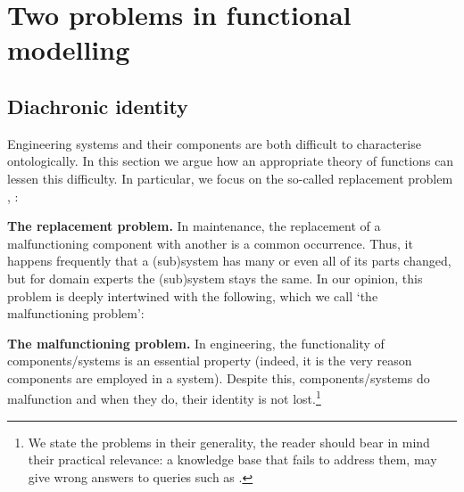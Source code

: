 \documentclass[
]{ceurart}
\begin{document}
\section{Two problems in functional modelling}

\subsection{Diachronic identity}\label{subsec:identity}
Engineering systems and their components are both difficult to characterise ontologically. %
In this section we argue how an appropriate theory of functions can lessen this difficulty. %
In particular, we focus on the so-called replacement problem \cite{guarinoArtefactualSystemsMissing2014},  \cite[Chapter 14]{westDevelopingHighQuality2011}:
\bflist
\item[\mypb{replacement}] \textbf{The replacement problem.} In maintenance, the replacement of a malfunctioning component
with another is a common occurrence. Thus, it happens frequently that a (sub)system has many or even all of its parts changed, but for domain experts the (sub)system stays the same. 
\eflist
In our opinion, this problem is deeply intertwined with the following, which we call `the malfunctioning problem':
\bflist
\item[\mypb{malfunctioning}] \textbf{The malfunctioning problem.} In engineering, the functionality of components/systems is an essential property (indeed, it is the very reason components are employed in a system). Despite this, components/systems do malfunction and when they do, their identity is not lost.\footnote{We state the problems in their generality, the reader should bear in mind their practical relevance: a knowledge base that fails to address them, may give wrong answers to queries such as .} 
\end{document}
